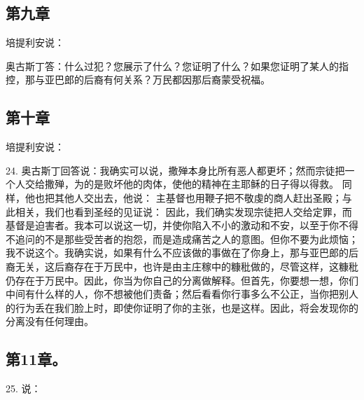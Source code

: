 \subsection{第九章}

培提利安说：\par

奥古斯丁答：什么过犯？您展示了什么？您证明了什么？如果您证明了某人的指控，那与亚巴郎的后裔有何关系？万民都因那后裔蒙受祝福。\par


\subsection{第十章}

培提利安说：\par

24. 奥古斯丁回答说：我确实可以说，撒殚本身比所有恶人都更坏；然而宗徒把一个人交给撒殚，为的是败坏他的肉体，使他的精神在主耶稣的日子得以得救。 同样，他也把其他人交出去，他说： 主基督也用鞭子把不敬虔的商人赶出圣殿；与此相关，我们也看到圣经的见证说： 因此，我们确实发现宗徒把人交给定罪，而基督是迫害者。我本可以说这一切，并使你陷入不小的激动和不安，以至于你不得不追问的不是那些受苦者的抱怨，而是造成痛苦之人的意图。但你不要为此烦恼；我不说这个。我确实说，如果有什么不应该做的事做在了你身上，那与亚巴郎的后裔无关，这后裔存在于万民中，也许是由主庄稼中的糠秕做的，尽管这样，这糠秕仍存在于万民中。因此，你当为你自己的分离做解释。但首先，你要想一想，你们中间有什么样的人，你不想被他们责备；然后看看你行事多么不公正，当你把别人的行为丢在我们脸上时，即使你证明了你的主张，也是这样。因此，将会发现你的分离没有任何理由。\par


\subsection{第11章。}

25. 说：\par

